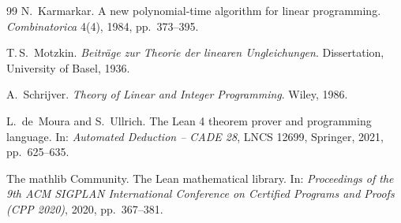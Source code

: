 \documentclass[11pt,a4paper]{article}
\theoremstyle{plain}
\theoremstyle{definition}
\theoremstyle{remark}
\begin{document}
\begin{thebibliography}{99}
N.~Karmarkar.
A new polynomial-time algorithm for linear programming.
\emph{Combinatorica} 4(4), 1984, pp.~373--395.

T.\,S.~Motzkin.
\emph{Beitr\"age zur Theorie der linearen Ungleichungen}.
Dissertation, University of Basel, 1936.

A.~Schrijver.
\emph{Theory of Linear and Integer Programming}.
Wiley, 1986.

L.~de~Moura and S.~Ullrich.
The Lean 4 theorem prover and programming language.
In: \emph{Automated Deduction -- CADE 28}, LNCS 12699, Springer, 2021, pp.~625--635.

The mathlib Community.
The Lean mathematical library.
In: \emph{Proceedings of the 9th ACM SIGPLAN International Conference on Certified Programs and
Proofs (CPP 2020)}, 2020, pp.~367--381.

\end{thebibliography}
\end{document}
